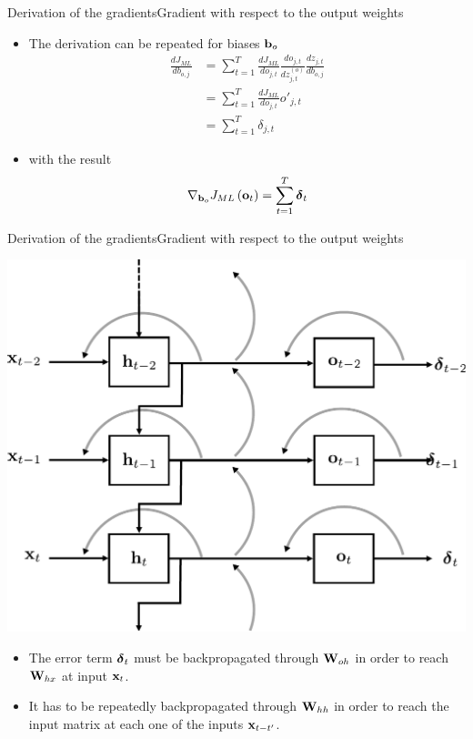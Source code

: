 \documentclass{beamer}
\begin{document}
\begin{frame}{Derivation of the gradients}{Gradient with respect to the output weights}
\begin{itemize}
\item The derivation can be repeated for biases ${\bf b}_o$
\begin{equation}
\begin{split}
\frac{dJ_{ML}}{db_{o,j}}&=\sum_{t=1}^T\frac{dJ_{ML}}{do_{j,t}} \frac{do_{j,t}}{dz^{(o)}_{j,t}}\frac{dz_{j,t}}{db_{o,j}}\\
&=\sum_{t=1}^T\frac{dJ_{ML}}{do_{j,t}} o'_{j,t}\\
&=\sum_{t=1}^T\delta_{j,t}
\end{split}
\end{equation}
\item with the result
\begin{equation}\label{eq:gradient_o}
 \nabla_{{\bf b}_{o}}J_{ML}\left( {\bf o}_t \right)  =  \sum_{t=1}^T   {\boldsymbol \delta}_{t} 
\end{equation}
\end{itemize}
\end{frame}


\begin{frame}{Derivation of the gradients}{Gradient with respect to the output weights}
\begin{multicols}{2}
\includegraphics[scale=0.35]{Module 5 (RNN)/pics/smaller_rnn_unrolled_BP.pdf}
\columnbreak
\begin{itemize}
    \item The error term ${\boldsymbol \delta}_t$ must be backpropagated through ${\bf W}_{oh}$ in order to reach ${\bf W}_{hx}$ at input ${\bf x}_t$.
    \item It has to be repeatedly backpropagated through ${\bf W}_{hh}$ in order to reach the input matrix at each one of the inputs ${\bf x}_{t-t'}$.
\end{itemize}
\end{multicols}
\end{frame}
\end{document}
